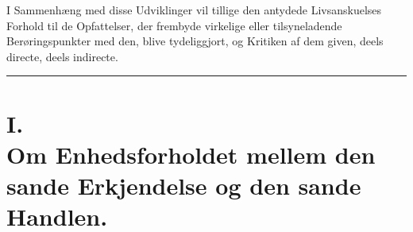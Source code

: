 I Sammenhæng med disse Udviklinger vil tillige den antydede Livsanskuelses
Forhold til de Opfattelser, der frembyde virkelige eller tilsyneladende
Berøringspunkter med den, blive tydeliggjort, og Kritiken af dem given, deels
directe, deels indirecte.

\begin{center}\rule{2cm}{0.4pt}\end{center}

\chapter*{I.\\ Om Enhedsforholdet mellem den sande Erkjendelse og den sande Handlen.}

